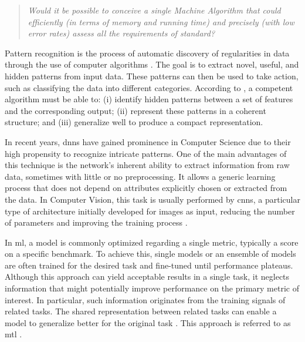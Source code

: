 \begin{quote}\emph{Would it be possible to conceive a single Machine Algorithm that could efficiently (in terms of memory and running time) and precisely (with low error rates) assess all the requirements of \icao standard?}\end{quote}

Pattern recognition is the process of automatic discovery of regularities in data through the use of computer algorithms \citep{bishop2006pattern}. The goal is to extract novel, useful, and hidden patterns from input data. These patterns can then be used to take action, such as classifying the data into different categories. According to \cite{orriols2008genetic}, a competent algorithm must be able to: (i) identify hidden patterns between a set of features and the corresponding output; (ii) represent these patterns in a coherent structure; and (iii) generalize well to produce a compact representation.
 
In recent years, \acfp{dnn} have gained prominence in Computer Science due to their high propensity to recognize intricate patterns. One of the main advantages of this technique is the network's inherent ability to extract information from raw data, sometimes with little or no preprocessing. It allows a generic learning process that does not depend on attributes explicitly chosen or extracted from the data. In Computer Vision, this task is usually performed by \acfp{cnn}, a particular type of architecture initially developed for images as input, reducing the number of parameters and improving the training process \citep{goodfellow2016deep}.
 
In \acf{ml}, a model is commonly optimized regarding a single metric, typically a score on a specific benchmark. To achieve this, single models or an ensemble of models are often trained for the desired task and fine-tuned until performance plateaus. Although this approach can yield acceptable results in a single task, it neglects information that might potentially improve performance on the primary metric of interest. In particular, such information originates from the training signals of related tasks. The shared representation between related tasks can enable a model to generalize better for the original task \citep{ruder2017overview}. This approach is referred to as \acf{mtl} \citep{Caruana1997}.
 
